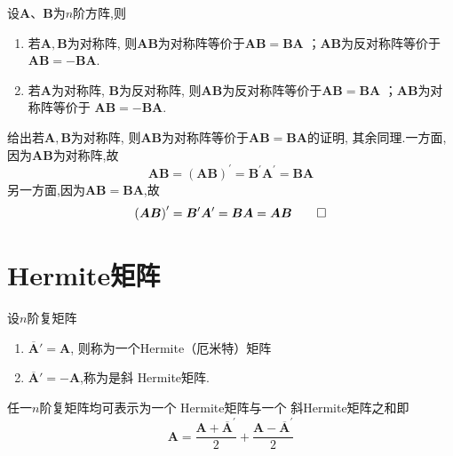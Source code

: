 \begin{formal}
    \begin{proposition}[对称与反对称刻画]\label{prop:对称与反对称刻画}
        设$\bm{A}$、$\bm{B}$为$n$阶方阵,则
        \begin{enumerate}[label=\textup{(\arabic*)}]
            \item 若$\bm{A},\bm{B}$为对称阵,
            则$\bm{AB}$为对称阵等价于$\bm{AB}=\bm{BA}$
            ；$\bm{AB}$为反对称阵等价于
            $\bm{AB}=-\bm{BA}.$
            \item 若$\bm{A}$为对称阵,
            $\bm{B}$为反对称阵,
            则$\bm{AB}$为反对称阵等价于$\bm{AB}=\bm{BA}$
            ；$\bm{AB}$为对称阵等价于
            $\bm{AB}=-\bm{BA}.$
        \end{enumerate}
    \end{proposition}
    \begin{Proof}
    给出若$\bm{A},\bm{B}$为对称阵,
            则$\bm{AB}$为对称阵等价于$\bm{AB}=\bm{BA}$的证明,
            其余同理.一方面,因为$\bm{AB}$为对称阵,故
        \[
        \bm{AB}=\left(\bm{AB}\right)^{\prime}=\bm{B}^{\prime}\bm{A}^{\prime}=\bm{BA}
        \]
        另一方面,因为$\bm{AB}=\bm{BA}$,故
        \[
        \left(\bm{AB}\right)^{\prime}=\bm{B}^{\prime}\bm{A}^{\prime}=\bm{BA}=\bm{AB}
        \qedhere \]
    \end{Proof}
\end{formal}
\newpage
\section{Hermite矩阵}
\begin{formal}
\begin{definition}[Hermite矩阵]\label{def:Hermite矩阵}
    设$n$阶复矩阵\begin{enumerate}[label=\textup{(\arabic*)}]
    \item $\overline{\bm{A}}'=\bm{A}$,
    则称为一个\textup{Hermite}（厄米特）矩阵
    \item $\overline{\bm{A}}'=-\bm{A}$,称为是斜
    \textup{Hermite}矩阵.
\end{enumerate}
\end{definition}
\end{formal}
\begin{formal}
\begin{theorem}[复矩阵拆分]\label{thm:复矩阵拆分}
    任一$n$阶复矩阵均可表示为一个
    \textup{Hermite}矩阵与一个
    斜\textup{Hermite}矩阵之和即
    \[
    \bm{A}=\frac{\bm{A}+\overline{\bm{A}}^{\prime}}{2}+
    \frac{\bm{A}-\overline{\bm{A}}^{\prime}}{2}
    \]
\end{theorem}
\end{formal}
\newpage
